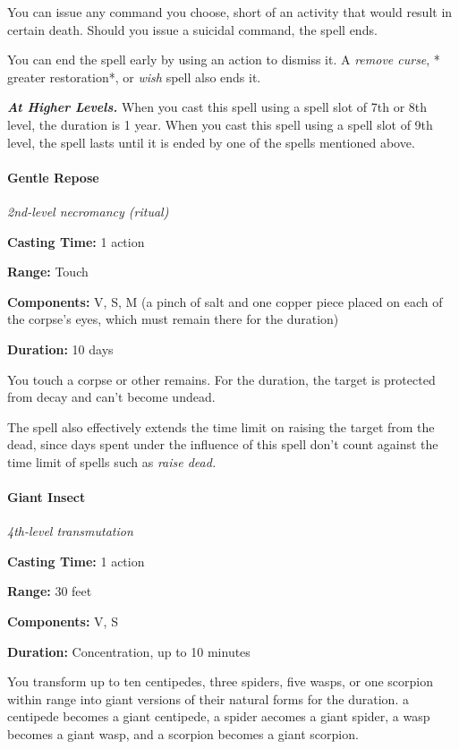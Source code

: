 \documentclass[
]{article}
\begin{document}
You can issue any command you choose, short of an activity that would
result in certain death. Should you issue a suicidal command, the spell
ends.

You can end the spell early by using an action to dismiss it. A
\emph{remove curse}, * greater restoration*, or \emph{wish} spell also
ends it.

\emph{\textbf{At Higher Levels.}} When you cast this spell using a spell
slot of 7th or 8th level, the duration is 1 year. When you cast this
spell using a spell slot of 9th level, the spell lasts until it is ended
by one of the spells mentioned above.

\hypertarget{gentle-repose}{%
\paragraph{Gentle Repose}\label{gentle-repose}}

\emph{2nd-level necromancy (ritual)}

\textbf{Casting Time:} 1 action

\textbf{Range:} Touch

\textbf{Components:} V, S, M (a pinch of salt and one copper piece
placed on each of the corpse's eyes, which must remain there for the
duration)

\textbf{Duration:} 10 days

You touch a corpse or other remains. For the duration, the target is
protected from decay and can't become undead.

The spell also effectively extends the time limit on raising the target
from the dead, since days spent under the influence of this spell don't
count against the time limit of spells such as \emph{raise dead.}

\hypertarget{giant-insect}{%
\paragraph{Giant Insect}\label{giant-insect}}

\emph{4th-level transmutation}

\textbf{Casting Time:} 1 action

\textbf{Range:} 30 feet

\textbf{Components:} V, S

\textbf{Duration:} Concentration, up to 10 minutes

You transform up to ten centipedes, three spiders, five wasps, or one
scorpion within range into giant versions of their natural forms for the
duration. a centipede becomes a giant centipede, a spider aecomes a
giant spider, a wasp becomes a giant wasp, and a scorpion becomes a
giant scorpion.
\end{document}
